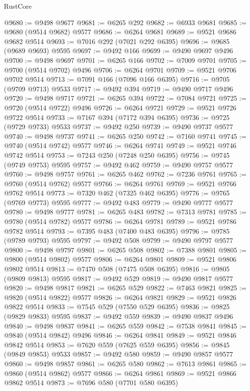 \begin{lexlean}{RustCore}
\begin{coremodule}
@9680 := @9498 @9677
@9681 := @6265 @292
@9682 := @6933 @9681
@9685 := @9680 (@9514 @9682) @9577
@9686 := @6264 @9681
@9689 := @9521 @9686 @9682 @9514
@9693 := @7016 @292 (@7021 @292 @6395)
@9696 := @9685 (@9689 @9693) @9595
@9697 := @9492 @166
@9699 := @9490 @9697 @9496
@9700 := @9498 @9697
@9701 := @6265 @166
@9702 := @7009 @9701
@9705 := @9700 (@9514 @9702) @9496
@9706 := @6264 @9701
@9709 := @9521 @9706 @9702 @9514
@9713 := @7091 @166 (@7096 @166 @6395)
@9716 := @9705 (@9709 @9713) @9533
@9717 := @9492 @394
@9719 := @9490 @9717 @9496
@9720 := @9498 @9717
@9721 := @6265 @394
@9722 := @7084 @9721
@9725 := @9720 (@9514 @9722) @9496
@9726 := @6264 @9721
@9729 := @9521 @9726 @9722 @9514
@9733 := @7167 @394 (@7172 @394 @6395)
@9736 := @9725 (@9729 @9733) @9533
@9737 := @9492 @250
@9739 := @9490 @9737 @9577
@9740 := @9498 @9737
@9741 := @6265 @250
@9742 := @7160 @9741
@9745 := @9740 (@9514 @9742) @9577
@9746 := @6264 @9741
@9749 := @9521 @9746 @9742 @9514
@9753 := @7243 @250 (@7248 @250 @6395)
@9756 := @9745 (@9749 @9753) @9595
@9757 := @9492 @462
@9759 := @9490 @9757 @9577
@9760 := @9498 @9757
@9761 := @6265 @462
@9762 := @7236 @9761
@9765 := @9760 (@9514 @9762) @9577
@9766 := @6264 @9761
@9769 := @9521 @9766 @9762 @9514
@9773 := @7320 @462 (@7325 @462 @6395)
@9776 := @9765 (@9769 @9773) @9595
@9777 := @9492 @483
@9779 := @9490 @9777 @9577
@9780 := @9498 @9777
@9781 := @6265 @483
@9782 := @7313 @9781
@9785 := @9780 (@9514 @9782) @9577
@9786 := @6264 @9781
@9789 := @9521 @9786 @9782 @9514
@9793 := @7395 @483 (@7400 @483 @6395)
@9796 := @9785 (@9789 @9793) @9595
@9797 := @9492 @508
@9799 := @9490 @9797 @9577
@9800 := @9498 @9797
@9801 := @6265 @508
@9802 := @7388 @9801
@9805 := @9800 (@9514 @9802) @9577
@9806 := @6264 @9801
@9809 := @9521 @9806 @9802 @9514
@9813 := @7470 @508 (@7475 @508 @6395)
@9816 := @9805 (@9809 @9813) @9595
@9817 := @9492 @529
@9819 := @9490 @9817 @9577
@9820 := @9498 @9817
@9821 := @6265 @529
@9822 := @7463 @9821
@9825 := @9820 (@9514 @9822) @9577
@9826 := @6264 @9821
@9829 := @9521 @9826 @9822 @9514
@9833 := @7545 @529 (@7550 @529 @6395)
@9836 := @9825 (@9829 @9833) @9595
@9837 := @9492 @559
@9839 := @9490 @9837 @9496
@9840 := @9498 @9837
@9841 := @6265 @559
@9842 := @7538 @9841
@9845 := @9840 (@9514 @9842) @9496
@9846 := @6264 @9841
@9849 := @9521 @9846 @9842 @9514
@9853 := @7620 @559 (@7625 @559 @6395)
@9856 := @9845 (@9849 @9853) @9533
@9857 := @9492 @580
@9859 := @9490 @9857 @9577
@9860 := @9498 @9857
@9861 := @6265 @580
@9862 := @7613 @9861
@9865 := @9860 (@9514 @9862) @9577
@9866 := @6264 @9861
@9869 := @9521 @9866 @9862 @9514
@9873 := @7696 @580 (@7701 @580 @6395)

\end{coremodule}
\end{lexlean}
